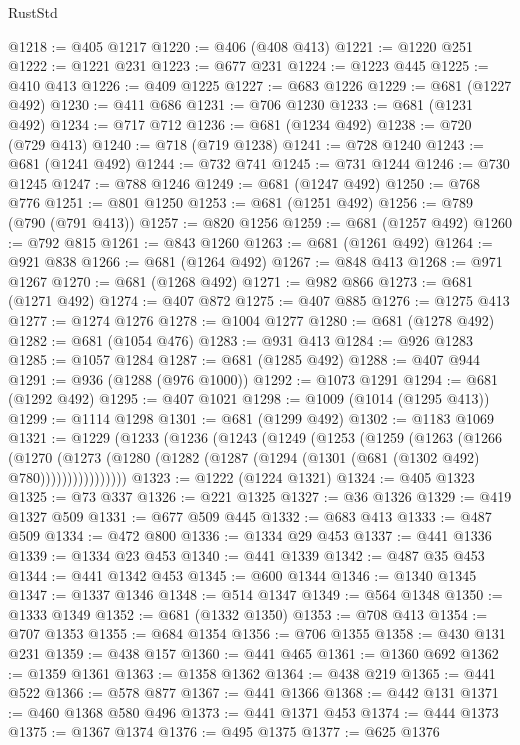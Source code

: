 \begin{lexlean}{RustStd}
\begin{coremodule}
{\begin{coremodule}
{{{{{{{{{{{{{{{{{{{{{{{{{{@1218 := @405 @1217
@1220 := @406 (@408 @413)
@1221 := @1220 @251
@1222 := @1221 @231
@1223 := @677 @231
@1224 := @1223 @445
@1225 := @410 @413
@1226 := @409 @1225
@1227 := @683 @1226
@1229 := @681 (@1227 @492)
@1230 := @411 @686
@1231 := @706 @1230
@1233 := @681 (@1231 @492)
@1234 := @717 @712
@1236 := @681 (@1234 @492)
@1238 := @720 (@729 @413)
@1240 := @718 (@719 @1238)
@1241 := @728 @1240
@1243 := @681 (@1241 @492)
@1244 := @732 @741
@1245 := @731 @1244
@1246 := @730 @1245
@1247 := @788 @1246
@1249 := @681 (@1247 @492)
@1250 := @768 @776
@1251 := @801 @1250
@1253 := @681 (@1251 @492)
@1256 := @789 (@790 (@791 @413))
@1257 := @820 @1256
@1259 := @681 (@1257 @492)
@1260 := @792 @815
@1261 := @843 @1260
@1263 := @681 (@1261 @492)
@1264 := @921 @838
@1266 := @681 (@1264 @492)
@1267 := @848 @413
@1268 := @971 @1267
@1270 := @681 (@1268 @492)
@1271 := @982 @866
@1273 := @681 (@1271 @492)
@1274 := @407 @872
@1275 := @407 @885
@1276 := @1275 @413
@1277 := @1274 @1276
@1278 := @1004 @1277
@1280 := @681 (@1278 @492)
@1282 := @681 (@1054 @476)
@1283 := @931 @413
@1284 := @926 @1283
@1285 := @1057 @1284
@1287 := @681 (@1285 @492)
@1288 := @407 @944
@1291 := @936 (@1288 (@976 @1000))
@1292 := @1073 @1291
@1294 := @681 (@1292 @492)
@1295 := @407 @1021
@1298 := @1009 (@1014 (@1295 @413))
@1299 := @1114 @1298
@1301 := @681 (@1299 @492)
@1302 := @1183 @1069
@1321 := @1229
    (@1233
      (@1236
        (@1243
          (@1249
            (@1253
              (@1259
                (@1263
                  (@1266
                    (@1270
                      (@1273
                        (@1280 (@1282 (@1287 (@1294 (@1301 (@681 (@1302 @492) @780))))))))))))))))
@1323 := @1222 (@1224 @1321)
@1324 := @405 @1323
@1325 := @73 @337
@1326 := @221 @1325
@1327 := @36 @1326
@1329 := @419 @1327 @509
@1331 := @677 @509 @445
@1332 := @683 @413
@1333 := @487 @509
@1334 := @472 @800
@1336 := @1334 @29 @453
@1337 := @441 @1336
@1339 := @1334 @23 @453
@1340 := @441 @1339
@1342 := @487 @35 @453
@1344 := @441 @1342 @453
@1345 := @600 @1344
@1346 := @1340 @1345
@1347 := @1337 @1346
@1348 := @514 @1347
@1349 := @564 @1348
@1350 := @1333 @1349
@1352 := @681 (@1332 @1350)
@1353 := @708 @413
@1354 := @707 @1353
@1355 := @684 @1354
@1356 := @706 @1355
@1358 := @430 @131 @231
@1359 := @438 @157
@1360 := @441 @465
@1361 := @1360 @692
@1362 := @1359 @1361
@1363 := @1358 @1362
@1364 := @438 @219
@1365 := @441 @522
@1366 := @578 @877
@1367 := @441 @1366
@1368 := @442 @131
@1371 := @460 @1368 @580 @496
@1373 := @441 @1371 @453
@1374 := @444 @1373
@1375 := @1367 @1374
@1376 := @495 @1375
@1377 := @625 @1376
}}}}}}}}}}}}}}}}}}}}}}}}}}
\end{coremodule}}
\end{coremodule}
\end{lexlean}
